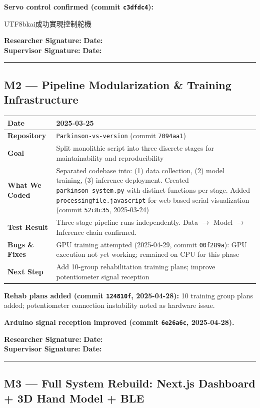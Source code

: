 \documentclass[12pt,a4paper]{article}
\makeatletter
\newcommand{\sigblock}{%
  \vspace{0.6em}
  \noindent\textbf{Researcher Signature:} \underline{\hspace{6cm}} \quad \textbf{Date:} \underline{\hspace{3cm}}\\[0.4em]
  \noindent\textbf{Supervisor Signature:} \underline{\hspace{6cm}} \quad \textbf{Date:} \underline{\hspace{3cm}}
  \vspace{0.4em}\hrule\vspace{0.6em}
}
\newenvironment{milestonetable}{%
  \begin{tcolorbox}[colback=codebg, colframe=codeframe, breakable, left=4pt, right=4pt, top=4pt, bottom=4pt]
  \begin{tabularx}{\linewidth}{@{}>{\bfseries}p{3.2cm} X@{}}
  \toprule
}{%
  \bottomrule
  \end{tabularx}
  \end{tcolorbox}
}
\newcommand{\mrow}[2]{\midrule #1 & #2 \\}
\makeatother
\begin{document}
\textbf{Servo control confirmed (commit \texttt{c3dfdc4}):} \begin{CJK}{UTF8}{bkai}成功實現控制舵機\end{CJK}

\sigblock

\subsection{M2 --- Pipeline Modularization \& Training Infrastructure}

\begin{milestonetable}
\mrow{Date}{2025-03-25}
\mrow{Repository}{\texttt{Parkinson-vs-version} (commit \texttt{7094aa1})}
\mrow{Goal}{Split monolithic script into three discrete stages for maintainability and reproducibility}
\mrow{What We Coded}{Separated codebase into: (1) data collection, (2) model training, (3) inference deployment. Created \texttt{parkinson\_system.py} with distinct functions per stage. Added \texttt{processingfile.javascript} for web-based serial visualization (commit \texttt{52c8c35}, 2025-03-24)}
\mrow{Test Result}{Three-stage pipeline runs independently. Data $\rightarrow$ Model $\rightarrow$ Inference chain confirmed.}
\mrow{Bugs \& Fixes}{GPU training attempted (2025-04-29, commit \texttt{00f289a}): GPU execution not yet working; remained on CPU for this phase}
\mrow{Next Step}{Add 10-group rehabilitation training plans; improve potentiometer signal reception}
\end{milestonetable}

\noindent\textbf{Rehab plans added (commit \texttt{124810f}, 2025-04-28):} 10 training group plans added; potentiometer connection instability noted as hardware issue.

\noindent\textbf{Arduino signal reception improved (commit \texttt{6e26a6c}, 2025-04-28).}

\sigblock

\subsection{M3 --- Full System Rebuild: Next.js Dashboard + 3D Hand Model + BLE}
\end{document}
